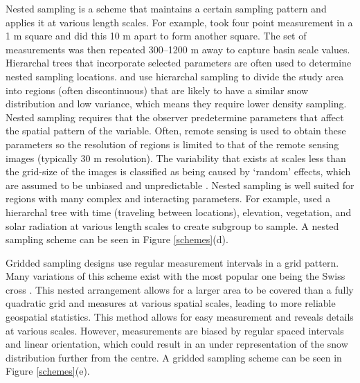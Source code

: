 \documentclass{sfuthesis}
\begin{document}
Nested sampling is a scheme that maintains a certain sampling pattern and applies it at various length scales. For example, \cite{Schweizer2008} took four point measurement in a 1 m square and did this 10 m apart to form another square. The set of measurements was then repeated 300--1200 m away to capture basin scale values. Hierarchal trees that incorporate selected parameters are often used to determine nested sampling locations. \cite{Watson2006} and \cite{Kasurak2011} use hierarchal sampling to divide the study area into regions (often discontinuous) that are likely to have a similar snow distribution and low variance, which means they require lower density sampling. Nested sampling requires that the observer predetermine parameters that affect the spatial pattern of the variable. Often, remote sensing is used to obtain these parameters so the resolution of regions is limited to that of the remote sensing images (typically 30 m resolution). The variability that exists at scales less than the grid-size of the images is classified as being caused by `random' effects, which are assumed to be unbiased and unpredictable \citep{Watson2006}. Nested sampling is well suited for regions with many complex and interacting parameters. For example, \cite{Watson2006} used a hierarchal tree with time (traveling between locations), elevation, vegetation, and solar radiation at various length scales to create subgroup to sample.  A nested sampling scheme can be seen in Figure \ref{schemes}(d). 

Gridded sampling designs use regular measurement intervals in a grid pattern. Many variations of this scheme exist \citep{Molotch2005a, Kronholm2007, Lopez2011} with the most popular one being the Swiss cross \citep{Kronholm2004}. This nested arrangement allows for a larger area to be covered than a fully quadratic grid and measures at various spatial scales, leading to more reliable geospatial statistics. This method allows for easy measurement and reveals details at various scales. However, measurements are biased by regular spaced intervals and linear orientation, which could result in an under representation of the snow distribution further from the centre. A gridded sampling scheme can be seen in Figure \ref{schemes}(e). 
\end{document}
